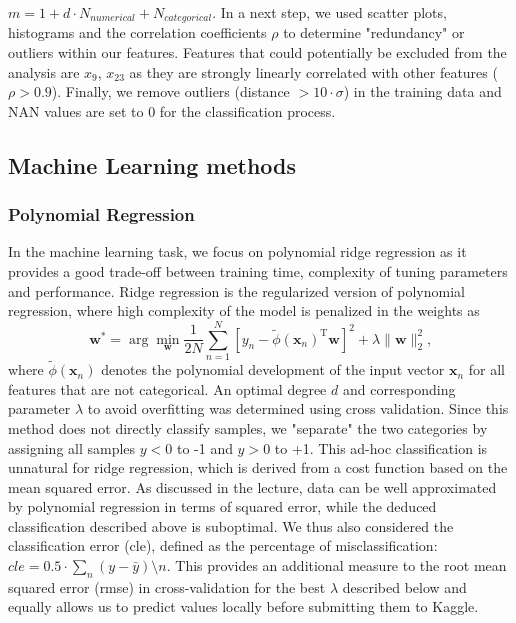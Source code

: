 $m = 1 + d \cdot N_{numerical} + N_{categorical}$.
In a next step, we used scatter plots, histograms and the correlation coefficients $\rho$ to determine "redundancy" or outliers within our features. Features that could potentially be excluded from the analysis are $x_{9}$, $x_{23}$ as they are strongly linearly correlated with other features ($\rho > 0.9$). Finally, we remove outliers (distance $>10 \cdot \sigma$) in the training data  and  NAN values are set to 0 for the classification process.




\subsection{Machine Learning methods}
\subsubsection{Polynomial Regression}
In the  machine learning task, we focus on polynomial ridge regression as it provides a good trade-off between training time, complexity of tuning parameters and performance.
Ridge regression is the regularized version of  polynomial regression,
where high complexity of the model is penalized in the weights as
\begin{equation}
\mathbf{w}^{*}=\arg\min_{\mathbf{w}} \frac{1}{2N}\sum_{n=1}^{N} [y_n -
  \widetilde{\phi}(\mathbf{x}_n)^\mathrm{T}\mathbf{w}]^2+
  \lambda\|\mathbf{w}\|_2^2 \text{,}
\end{equation}
where $\widetilde{\phi}(\mathbf{x}_n)$ denotes the polynomial development of the
input vector $\mathbf{x}_n$ for all features that are not categorical.  An optimal degree $d$ and corresponding parameter $\lambda$ to avoid overfitting  was determined using cross validation. \newline
Since this method does not directly classify samples, we "separate" the two categories by assigning all samples  $y < 0$ to -1  and  $y > 0$ to +1. This ad-hoc classification is unnatural for ridge regression, which is derived from a cost function based on the mean squared error. As discussed in the lecture, data can be  well
approximated by polynomial regression in terms of squared error, while the deduced
classification described above is suboptimal.
We thus also considered the classification error (cle), defined as the percentage of misclassification: $\textit{cle}= 0.5 \cdot \sum_n (y-\bar{y})\setminus n$. This provides an additional measure to the root mean squared error (rmse) in cross-validation for the best $\lambda$ described below and equally allows us to predict values locally before submitting them to Kaggle.


